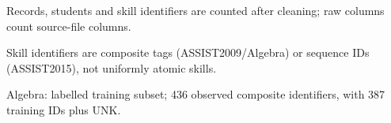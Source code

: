 \begin{table}[htbp]
\centering
\setcounter{table}{1}
\caption{Overview of datasets}
\begin{minipage}{\textwidth}\footnotesize
Records, students and skill identifiers are counted after cleaning; raw columns count source-file columns.\par Skill identifiers are composite tags (ASSIST2009/Algebra) or sequence IDs (ASSIST2015), not uniformly atomic skills.\par Algebra: labelled training subset; 436 observed composite identifiers, with 387 training IDs plus UNK.
\end{minipage}
\end{table}
